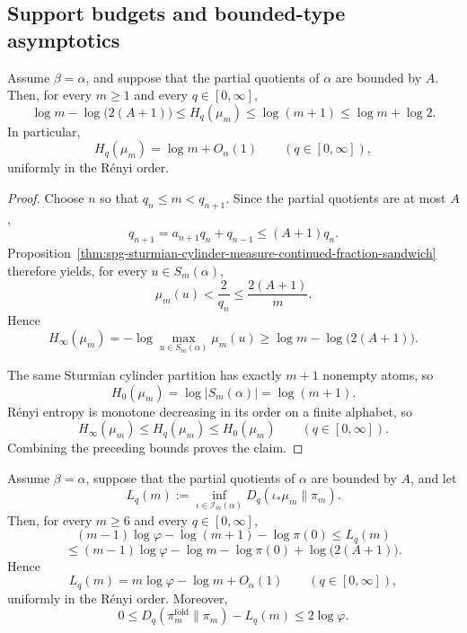 \subsection{Support budgets and bounded-type asymptotics}

\begin{proposition}\label{prop:bounded-type-sturmian-entropy}
Assume \(\beta=\alpha\), and suppose that the partial quotients of \(\alpha\)
are bounded by \(A\). Then, for every \(m\ge1\) and every \(q\in[0,\infty]\),
\[
\log m-\log\!\bigl(2(A+1)\bigr)
\le
H_q(\mu_m)
\le
\log(m+1)
\le
\log m+\log 2.
\]
In particular,
\[
H_q(\mu_m)=\log m+O_\alpha(1)
\qquad (q\in[0,\infty]),
\]
uniformly in the R\'enyi order.
\end{proposition}

\begin{proof}
Choose \(n\) so that \(q_n\le m<q_{n+1}\). Since the partial quotients are at
most \(A\),
\[
q_{n+1}=a_{n+1}q_n+q_{n-1}\le (A+1)q_n.
\]
Proposition~\ref{thm:spg-sturmian-cylinder-measure-continued-fraction-sandwich}
therefore yields, for every \(u\in S_m(\alpha)\),
\[
\mu_m(u)<\frac{2}{q_n}\le \frac{2(A+1)}{m}.
\]
Hence
\[
H_\infty(\mu_m)
=
-\log\max_{u\in S_m(\alpha)}\mu_m(u)
\ge
\log m-\log\!\bigl(2(A+1)\bigr).
\]

The same Sturmian cylinder partition has exactly \(m+1\) nonempty atoms, so
\[
H_0(\mu_m)=\log|S_m(\alpha)|=\log(m+1).
\]
R\'enyi entropy is monotone decreasing in its order on a finite alphabet, so
\[
H_\infty(\mu_m)\le H_q(\mu_m)\le H_0(\mu_m)
\qquad (q\in[0,\infty]).
\]
Combining the preceding bounds proves the claim.
\end{proof}

\begin{corollary}
\label{cor:injective-relabeling-bounded-type}
Assume \(\beta=\alpha\), suppose that the partial quotients of \(\alpha\) are
bounded by \(A\), and let
\[
L_q(m):=\inf_{\iota\in\mathcal I_m(\alpha)}D_q(\iota_*\mu_m\|\pi_m).
\]
Then, for every \(m\ge6\) and every \(q\in[0,\infty]\),
\[
(m-1)\log\varphi-\log(m+1)-\log\pi(0)
\le
L_q(m)
\]
\[
\le
(m-1)\log\varphi-\log m-\log\pi(0)
+
\log\!\bigl(2(A+1)\bigr).
\]
Hence
\[
L_q(m)=m\log\varphi-\log m+O_\alpha(1)
\qquad (q\in[0,\infty]),
\]
uniformly in the R\'enyi order. Moreover,
\[
0
\le
D_q(\pi_m^{\mathrm{fold}}\|\pi_m)-L_q(m)
\le
2\log\varphi.
\]
\end{corollary}

